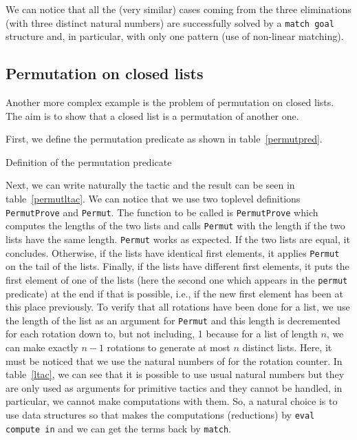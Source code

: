 We can notice that all the (very similar) cases coming from the three
eliminations (with three distinct natural numbers) are successfully solved by
a {\tt match goal} structure and, in particular, with only one pattern (use
of non-linear matching).

\subsection{Permutation on closed lists}

Another more complex example is the problem of permutation on closed lists. The
aim is to show that a closed list is a permutation of another one.

First, we define the permutation predicate as shown in table~\ref{permutpred}.

\begin{table}[ht]
\noindent{}
\caption{Definition of the permutation predicate}
\label{permutpred}
\end{table}

Next, we can write naturally the tactic and the result can be seen in
table~\ref{permutltac}. We can notice that we use two toplevel definitions {\tt
PermutProve} and {\tt Permut}. The function to be called is {\tt PermutProve}
which computes the lengths of the two lists and calls {\tt Permut} with the
length if the two lists have the same length. {\tt Permut} works as expected.
If the two lists are equal, it concludes. Otherwise, if the lists have
identical first elements, it applies {\tt Permut} on the tail of the lists.
Finally, if the lists have different first elements, it puts the first element
of one of the lists (here the second one which appears in the {\tt permut}
predicate) at the end if that is possible, i.e., if the new first element has
been at this place previously. To verify that all rotations have been done for
a list, we use the length of the list as an argument for {\tt Permut} and this
length is decremented for each rotation down to, but not including, 1 because
for a list of length $n$, we can make exactly $n-1$ rotations to generate at
most $n$ distinct lists. Here, it must be noticed that we use the natural
numbers of {\Coq} for the rotation counter. In table~\ref{ltac}, we can see
that it is possible to use usual natural numbers but they are only used as
arguments for primitive tactics and they cannot be handled, in particular, we
cannot make computations with them. So, a natural choice is to use {\Coq} data
structures so that {\Coq} makes the computations (reductions) by {\tt eval
compute in} and we can get the terms back by {\tt match}.
 
